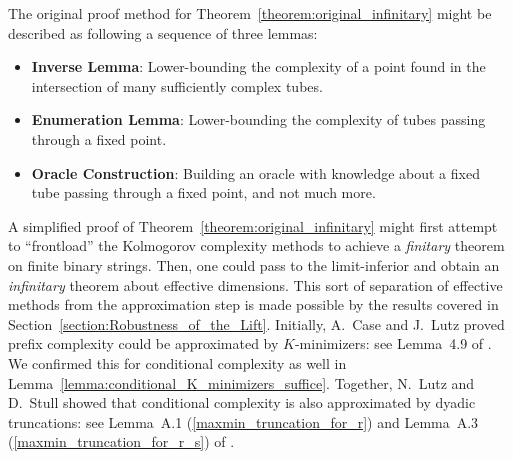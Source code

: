 The original proof method for Theorem~\ref{theorem:original_infinitary} might be described as following a sequence of three lemmas:
\begin{itemize}
    \item \textbf{Inverse Lemma}: Lower-bounding the complexity of a point found in the intersection of many sufficiently complex tubes. 
    \item \textbf{Enumeration Lemma}: Lower-bounding the complexity of tubes passing through a fixed point.
    \item \textbf{Oracle Construction}: Building an oracle with knowledge about a fixed tube passing through a fixed point, and not much more. 
\end{itemize}

A simplified proof of Theorem~\ref{theorem:original_infinitary} might first attempt to ``frontload'' the Kolmogorov complexity methods to achieve a \textit{finitary} theorem on finite binary strings. Then, one could pass to the limit-inferior and obtain an \textit{infinitary} theorem about effective dimensions. This sort of separation of effective methods from the approximation step is made possible by the results covered in Section~\ref{section:Robustness_of_the_Lift}. Initially, A.~Case and J.~Lutz proved prefix complexity could be approximated by $K$-minimizers: see Lemma~4.9 of \cite{CL14}. We confirmed this for conditional complexity as well in Lemma~\ref{lemma:conditional_K_minimizers_suffice}. Together, N.~Lutz and D.~Stull showed that conditional complexity is also approximated by dyadic truncations: see Lemma~A.1 (\ref{maxmin_truncation_for_r}) and Lemma~A.3  (\ref{maxmin_truncation_for_r_s}) of \cite{LS16}. 

